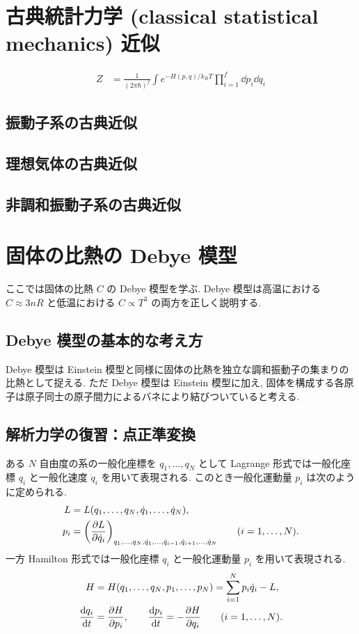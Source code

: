\documentclass[uplatex,dvipdfmx,a4paper,11pt]{jlreq}
\theoremstyle{definition}
\begin{document}
\section{古典統計力学 (classical statistical mechanics) 近似}

\begin{theorem}
  \begin{align}
    Z & = \frac{1}{(2\pi\hbar)^f}\int e^{-H(p, q)/k_BT}\prod_{i=1}^{f}\dd{p_i}\dd{q_i}
  \end{align}
\end{theorem}

\subsection{振動子系の古典近似}
\subsection{理想気体の古典近似}
\subsection{非調和振動子系の古典近似}

\section{固体の比熱の Debye 模型}
ここでは固体の比熱 $C$ の Debye 模型を学ぶ. Debye 模型は高温における $C\approx 3nR$ と低温における $C\propto T^3$ の両方を正しく説明する.
\subsection{Debye 模型の基本的な考え方}
Debye 模型は Einstein 模型と同様に固体の比熱を独立な調和振動子の集まりの比熱として捉える. ただ Debye 模型は Einstein 模型に加え, 固体を構成する各原子は原子同士の原子間力によるバネにより結びついていると考える.

\subsection{解析力学の復習：点正準変換}
ある $N$ 自由度の系の一般化座標を $q_1, \ldots, q_N$ として Lagrange 形式では一般化座標 $q_i$ と一般化速度 $\dot{q}_i$ を用いて表現される. このとき一般化運動量 $p_i$ は次のように定められる.
\begin{align}
  L   & = L(q_1,\ldots,q_N,\dot{q}_1,\ldots,\dot{q}_N),                                                                                    \\
  p_i & = \qty(\pdv{L}{\dot{q}_i})_{q_1,\ldots,q_N,\dot{q}_1,\ldots,\dot{q}_{i-1},\dot{q}_{i+1},\ldots,\dot{q}_N} \qquad (i = 1,\ldots,N).
\end{align}
一方 Hamilton 形式では一般化座標 $q_i$ と一般化運動量 $p_i$ を用いて表現される.
\begin{align}
  H           & = H(q_1,\ldots,q_N,p_1,\ldots,p_N) = \sum_{i=1}^{N}p_i\dot{q}_i - L,        \\
  \dv{q_i}{t} & = \pdv{H}{p_i}, \qquad \dv{p_i}{t} = -\pdv{H}{q_i} \qquad (i = 1,\ldots,N).
\end{align}
\end{document}
